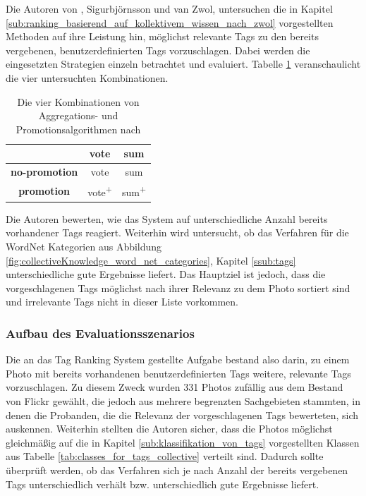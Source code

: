 Die Autoren von \cite{collectiveKnowledge}, Sigurbjörnsson und van Zwol, untersuchen die in Kapitel \ref{sub:ranking_basierend_auf_kollektivem_wissen_nach_zwol} vorgestellten Methoden auf ihre Leistung hin, möglichst relevante Tags zu den bereits vergebenen, benutzerdefinierten Tags vorzuschlagen. Dabei werden die eingesetzten Strategien einzeln betrachtet und evaluiert. Tabelle \ref{tab:fourStrategiesBjoern} veranschaulicht die vier untersuchten Kombinationen.

\begin{table}[htbp]
  \centering
  \begin{tabular}{c|cc}
    \hline
     & \textbf{vote} & \textbf{sum}\\
    \hline
    \textbf{no-promotion} & vote & sum\\
    \hline
    \textbf{promotion} & vote\textsuperscript{+} & sum\textsuperscript{+}\\
    \hline
  \end{tabular}
  \caption{Die vier Kombinationen von Aggregations- und Promotionsalgorithmen nach \cite{collectiveKnowledge}}
  \label{tab:fourStrategiesBjoern}
\end{table}


Die Autoren bewerten, wie das System auf unterschiedliche Anzahl bereits vorhandener Tags reagiert. Weiterhin wird untersucht, ob das Verfahren für die WordNet Kategorien aus Abbildung \ref{fig:collectiveKnowledge_word_net_categories}, Kapitel \ref{ssub:tags} unterschiedliche gute Ergebnisse liefert. Das Hauptziel ist jedoch, dass die vorgeschlagenen Tags möglichst nach ihrer Relevanz zu dem Photo sortiert sind und irrelevante Tags nicht in dieser Liste vorkommen.

\subsubsection{Aufbau des Evaluationsszenarios} %
\label{ssub:aufbau_des_evaluationsszenarios}

Die an das Tag Ranking System gestellte Aufgabe bestand also darin, zu einem Photo mit bereits vorhandenen benutzerdefinierten Tags weitere, relevante Tags vorzuschlagen. Zu diesem Zweck wurden 331 Photos zufällig aus dem Bestand von Flickr gewählt, die jedoch aus mehrere begrenzten Sachgebieten stammten, in denen die Probanden, die die Relevanz der vorgeschlagenen Tags bewerteten, sich auskennen.
Weiterhin stellten die Autoren sicher, dass die Photos möglichst gleichmäßig auf die in Kapitel \ref{sub:klassifikation_von_tags} vorgestellten Klassen aus Tabelle \ref{tab:classes_for_tags_collective} verteilt sind. Dadurch sollte überprüft werden, ob das Verfahren sich je nach Anzahl der bereits vergebenen Tags unterschiedlich verhält bzw. unterschiedlich gute Ergebnisse liefert.
  
